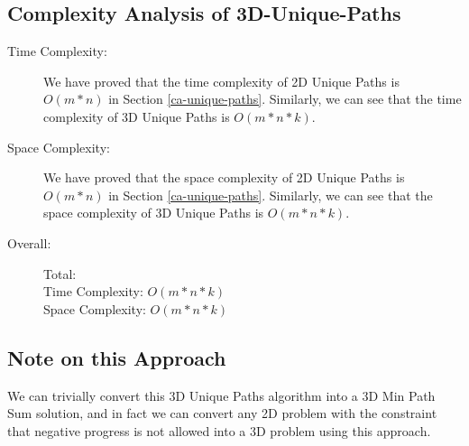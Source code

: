 \subsection{Complexity Analysis of 3D-Unique-Paths}

\begin{description}
    \item[Time Complexity:]
        We have proved that the time complexity of 2D Unique Paths is $O(m * n)$ in Section \ref{ca-unique-paths}.
        Similarly, we can see that the time complexity of 3D Unique Paths is $O(m * n * k)$.
        
        
    \item[Space Complexity:] 
        We have proved that the space complexity of 2D Unique Paths is $O(m * n)$ in Section \ref{ca-unique-paths}.
        Similarly, we can see that the space complexity of 3D Unique Paths is $O(m * n * k)$.
            
        
    \item[Overall:] Total:\\
        Time Complexity: $O(m * n * k)$\\
        Space Complexity: $O(m * n * k)$
\end{description}

\subsection{Note on this Approach}
We can trivially convert this 3D Unique Paths algorithm into a 3D Min Path Sum solution, and in fact we can convert any 2D problem with the constraint that negative progress is not allowed into a 3D problem using this approach.



